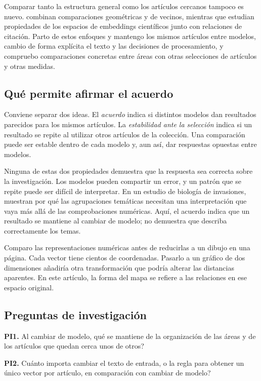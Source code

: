 Comparar tanto la estructura general como los artículos cercanos tampoco es nuevo. \citet{ref4e1e0d5582} combinan comparaciones geométricas y de vecinos, mientras que \citet{ref6da178065c} estudian propiedades de los espacios de embeddings científicos junto con relaciones de citación. Parto de estos enfoques y mantengo los mismos artículos entre modelos, cambio de forma explícita el texto y las decisiones de procesamiento, y compruebo comparaciones concretas entre áreas con otras selecciones de artículos y otras medidas.

\subsection{Qué permite afirmar el acuerdo}
Conviene separar dos ideas. El \emph{acuerdo} indica si distintos modelos dan resultados parecidos para los mismos artículos. La \emph{estabilidad ante la selección} indica si un resultado se repite al utilizar otros artículos de la colección. Una comparación puede ser estable dentro de cada modelo y, aun así, dar respuestas opuestas entre modelos.

Ninguna de estas dos propiedades demuestra que la respuesta sea correcta sobre la investigación. Los modelos pueden compartir un error, y un patrón que se repite puede ser difícil de interpretar. En un estudio de biología de invasiones, \citet{QSSreviewQ17} muestran por qué las agrupaciones temáticas necesitan una interpretación que vaya más allá de las comprobaciones numéricas. Aquí, el acuerdo indica que un resultado se mantiene al cambiar de modelo; no demuestra que describa correctamente los temas.

Comparo las representaciones numéricas antes de reducirlas a un dibujo en una página. Cada vector tiene cientos de coordenadas. Pasarlo a un gráfico de dos dimensiones añadiría otra transformación que podría alterar las distancias aparentes. En este artículo, la forma del mapa se refiere a las relaciones en ese espacio original.

\subsection{Preguntas de investigación}
\textbf{PI1.} Al cambiar de modelo, \textquestiondown{}qué se mantiene de la organización de las áreas y de los artículos que quedan cerca unos de otros?

\textbf{PI2.} \textquestiondown{}Cuánto importa cambiar el texto de entrada, o la regla para obtener un único vector por artículo, en comparación con cambiar de modelo?

